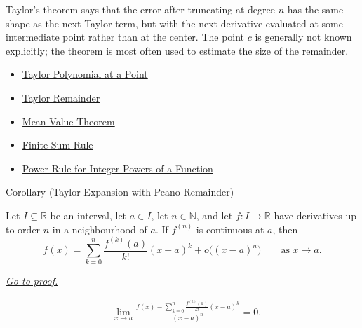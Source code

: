 \begin{remark*}[Interpretation]
Taylor's theorem says that the error after truncating at degree $n$ has the
same shape as the next Taylor term, but with the next derivative evaluated at
some intermediate point rather than at the center. The point $c$ is generally
not known explicitly; the theorem is most often used to estimate the size of
the remainder.
\end{remark*}

\begin{dependencies}
\begin{itemize}
  \item \hyperref[def:taylor-polynomial-at-a-point]{Taylor Polynomial at a Point}
  \item \hyperref[def:taylor-remainder]{Taylor Remainder}
  \item \hyperref[thm:mean-value-theorem]{Mean Value Theorem}
  \item \hyperref[cor:finite-sum-rule]{Finite Sum Rule}
  \item \hyperref[cor:power-rule-special-case]{Power Rule for Integer Powers of a Function}
\end{itemize}
\end{dependencies}


\begin{corollarybox}{Corollary (Taylor Expansion with Peano Remainder)}
\begin{corollary}
\label{cor:taylor-expansion-peano-remainder}
Let $I\subseteq\mathbb{R}$ be an interval, let $a\in I$, let
$n\in\mathbb{N}$, and let $f:I\to\mathbb{R}$ have derivatives up to order
$n$ in a neighbourhood of $a$. If $f^{(n)}$ is continuous at $a$, then
\[
  f(x)
  =
  \sum_{k=0}^{n}\frac{f^{(k)}(a)}{k!}(x-a)^k
  +
  o\bigl((x-a)^n\bigr)
  \qquad\text{as }x\to a.
\]

\smallskip
\noindent
\hyperref[prf:taylor-expansion-peano-remainder]{\textit{Go to proof.}}
\end{corollary}
\end{corollarybox}

\begin{remark*}
\[
\begin{aligned}
&\lim_{x\to a}
\frac{
  f(x)-\sum_{k=0}^{n}\frac{f^{(k)}(a)}{k!}(x-a)^k
}{
  (x-a)^n
}
=0.
\end{aligned}
\]
\end{remark*}


